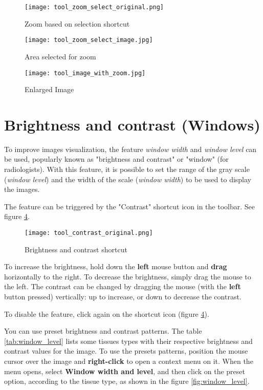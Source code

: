 \begin{figure}[!htb]
\centering
\texttt{[image: tool\_zoom\_select\_original.png]}
\caption{Zoom based on selection shortcut}
\label{fig:zoom_icon_loc}
\end{figure}

\begin{figure}[!htb]
\centering
\texttt{[image: tool\_zoom\_select\_image.jpg]}
\caption{Area selected for zoom}
\label{fig:zoom_select}
\end{figure}

\begin{figure}[!htb]
\centering
\texttt{[image: tool\_image\_with\_zoom.jpg]}
\caption{Enlarged Image}
\label{fig:zoom_applied}
\end{figure}


\section{Brightness and contrast (Windows)}
\label{sec:ww_wl}

To improve images visualization, the feature \textit{window width} and \textit{window level} can be used, popularly known as "brightness and contrast" or "window" (for radiologists). With this feature, it is possible to set the range of the gray scale (\textit{window level}) and the width of the scale (\textit{window width}) to be used to display the images.

The feature can be triggered by the "Contrast" shortcut icon in the toolbar. See figure \ref{fig:window_level_shortcut}.

\begin{figure}[!htb]
\centering
\texttt{[image: tool\_contrast\_original.png]}
\caption{Brightness and contrast shortcut}
\label{fig:window_level_shortcut}
\end{figure}

To increase the brightness, hold down the \textbf{left} mouse button and \textbf{drag} horizontally to the right. To decrease the brightness, simply drag the mouse to the left. The contrast can be changed by dragging the mouse (with the \textbf{left} button pressed) vertically: up to increase, or down to decrease the contrast.

To disable the feature, click again on the shortcut icon (figure \ref{fig:window_level_shortcut}).

You can use preset brightness and contrast patterns. The table \ref{tab:window_level} lists some tissues types with their respective brightness and contrast values for the image. To use the presets patterns, position the mouse cursor over the image and \textbf{right-click} to open a context menu on it. When the menu opens, select \textbf{Window width and level}, and then click on the preset option, according to the tissue type, as shown in the figure \ref{fig:window_level}.

